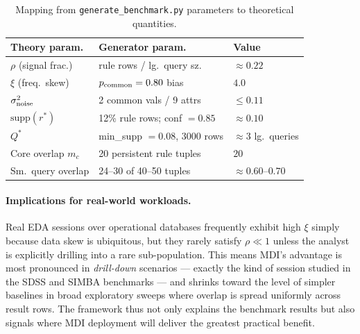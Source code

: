 \begin{table}[t!]
  \centering
  \caption{%
    Mapping from \texttt{generate\_benchmark.py} parameters to theoretical
    quantities.
  }
  \label{tab:benchmark-params}
  \footnotesize
  \setlength{\tabcolsep}{3pt}
  \begin{tabular}{l l l}
    \toprule
    \textbf{Theory param.} & \textbf{Generator param.} & \textbf{Value} \\
    \midrule
    $\rho$ (signal frac.)     & rule rows / lg.\ query sz.       & $\approx 0.22$ \\
    $\xi$ (freq.\ skew)       & $p_{\rm common} = 0.80$ bias     & $4.0$ \\
    $\sigma^2_{\rm noise}$    & 2 common vals / 9 attrs           & $\leq 0.11$ \\
    $\text{supp}(r^*)$        & 12\% rule rows; conf $= 0.85$    & $\approx 0.10$ \\
    $Q^*$                     & min\_supp $= 0.08$, 3000 rows    & $\approx 3$ lg.\ queries \\
    Core overlap $m_c$        & 20 persistent rule tuples         & $20$ \\
    Sm.\ query overlap        & 24--30 of 40--50 tuples           & $\approx 0.60$--$0.70$ \\
    \bottomrule
  \end{tabular}
\end{table}

\paragraph{Implications for real-world workloads.}
Real EDA sessions over operational databases frequently exhibit high $\xi$ simply
because data skew is ubiquitous, but they rarely satisfy $\rho \ll 1$ unless the
analyst is explicitly drilling into a rare sub-population.  This means MDI's
advantage is most pronounced in \emph{drill-down} scenarios --- exactly the kind
of session studied in the SDSS and SIMBA benchmarks --- and shrinks toward the
level of simpler baselines in broad exploratory sweeps where overlap is spread
uniformly across result rows.  The framework thus not only explains the benchmark
results but also signals where MDI deployment will deliver the greatest practical
benefit.
